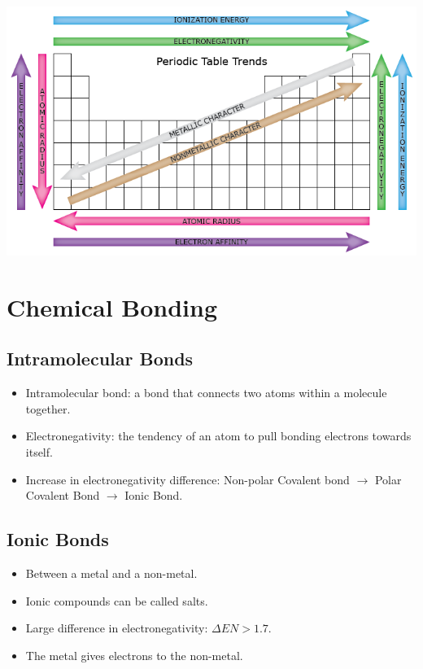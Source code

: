 \documentclass{article}
\begin{document}
\begin{center}
    \includegraphics[scale=0.45]{periodic_table_trends.png}
\end{center}

\section{Chemical Bonding}

\subsection{Intramolecular Bonds}

\begin{itemize}
    \item Intramolecular bond: a bond that connects two atoms within a molecule together.
    \item Electronegativity: the tendency of an atom to pull bonding electrons towards itself.
    \item Increase in electronegativity difference: Non-polar Covalent bond $\rightarrow$ Polar Covalent Bond $\rightarrow$ Ionic Bond.
\end{itemize}

\subsection{Ionic Bonds}

\begin{itemize}
    \item Between a metal and a non-metal.
    \item Ionic compounds can be called salts.
    \item Large difference in electronegativity: $\Delta EN > 1.7$.
    \item The metal gives electrons to the non-metal.
\end{itemize}
\end{document}
